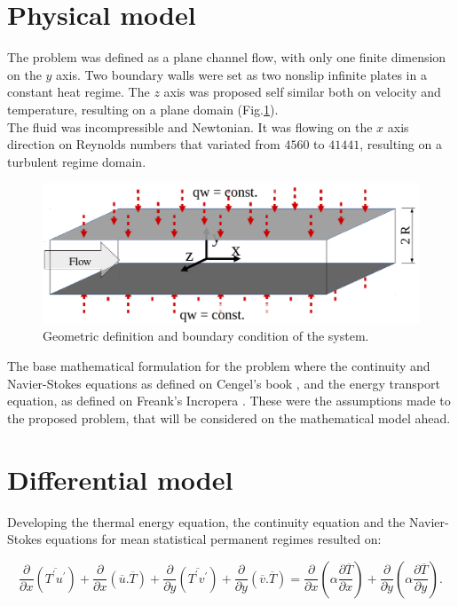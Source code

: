 \documentclass[10pt]{article} %
\begin{document}
\section{Physical model}

The problem was defined as a plane channel flow, with only one finite dimension on the $y$ axis. Two boundary walls were set as two nonslip infinite plates in a constant heat regime. The $z$ axis was proposed self similar both on velocity and temperature, resulting on a plane domain (Fig.\ref{figure.1}). \\
The fluid was incompressible and Newtonian. It was flowing on the $x$ axis direction on Reynolds numbers that variated from $4560$ to $41441$, resulting on a turbulent regime domain. 

\begin{figure}[h!]
	\centering
	\includegraphics[angle=0, scale=0.50]{figure1}
	\caption{Geometric definition and boundary condition of the system.}
	\label{figure.1}
\end{figure}

The base mathematical formulation for the problem where the continuity and Navier-Stokes equations as defined on Cengel's book \cite{Cengel}, and the  energy transport equation, as defined on Freank's Incropera \cite{Incropera}. These were the assumptions made to the proposed problem, that will be considered on the mathematical model ahead.









\section{Differential model}

Developing the thermal energy equation, the continuity equation and the Navier-Stokes equations for mean statistical permanent regimes resulted on: 


\begin{equation}\label{energy permanent}
\frac{\partial{}}{\partial{x}} \left(\overline{T^\prime u^\prime}\right) + \frac{\partial{}}{\partial{x}}\left(\overline{u}.\overline{T}\right)     + 
\frac{\partial{}}{\partial{y}} \left(\overline{T^\prime v^\prime}\right) + \frac{\partial{}}{\partial{y}}\left(\overline{v}.\overline{T}\right) 
=
{\frac{\partial{}}{\partial{x}}} \left(\alpha {\frac{\partial{\overline{T}}}{\partial{x}}} \right) +
{\frac{\partial{}}{\partial{y}}} \left(\alpha {\frac{\partial{\overline{T}}}{\partial{y}}} \right). 
\end{equation}
\end{document}
